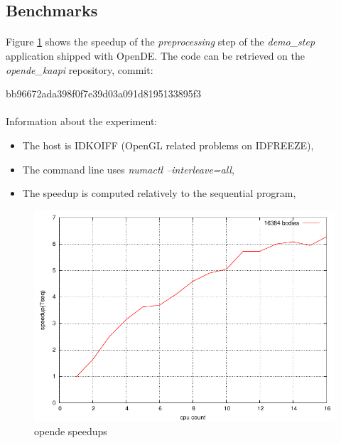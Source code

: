\documentclass[a4paper, 11pt]{article}
\begin{document}
\subsection{Benchmarks}
\paragraph{}
Figure \ref{opende_speedups} shows the speedup of the \textit{preprocessing} step of the
\textit{demo\_step} application shipped with OpenDE. The code can be retrieved on the
\textit{opende\_kaapi} repository, commit:
\begin{center}
  bb96672ada398f0f7e39d03a091d8195133895f3
\end{center}

\paragraph{}
Information about the experiment:
\begin{itemize}
\item The host is IDKOIFF (OpenGL related problems on IDFREEZE),
\item The command line uses \textit{numactl --interleave=all},
\item The speedup is computed relatively to the sequential program,
\end{itemize}

\begin{figure}[!ht]
\centering
\includegraphics[keepaspectratio=true, width=\linewidth]{../graphs/opende_speedups.pdf}
\caption{opende speedups}
\label{opende_speedups}
\end{figure}
\end{document}
